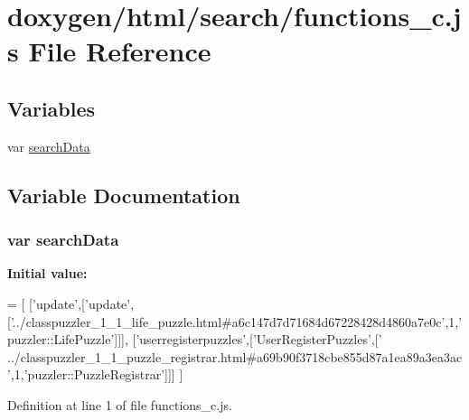 \hypertarget{a00095}{}\section{doxygen/html/search/functions\+\_\+c.js File Reference}
\label{a00095}
\subsection*{Variables}
\begin{DoxyCompactItemize}
\item 
var \hyperlink{a00095_ad01a7523f103d6242ef9b0451861231e}{search\+Data}
\end{DoxyCompactItemize}


\subsection{Variable Documentation}
\hypertarget{a00095_ad01a7523f103d6242ef9b0451861231e}{}
\subsubsection[{search\+Data}]{\setlength{\rightskip}{0pt plus 5cm}var search\+Data}\label{a00095_ad01a7523f103d6242ef9b0451861231e}
{\bfseries Initial value\+:}
\begin{DoxyCode}
=
[
  [\textcolor{stringliteral}{'update'},[\textcolor{stringliteral}{'update'},[\textcolor{stringliteral}{'../classpuzzler\_1\_1\_life\_puzzle.html#a6c147d7d71684d67228428d4860a7e0c'},1,\textcolor{stringliteral}{'
      puzzler::LifePuzzle'}]]],
  [\textcolor{stringliteral}{'userregisterpuzzles'},[\textcolor{stringliteral}{'UserRegisterPuzzles'},[\textcolor{stringliteral}{'
      ../classpuzzler\_1\_1\_puzzle\_registrar.html#a69b90f3718cbe855d87a1ea89a3ea3ac'},1,\textcolor{stringliteral}{'puzzler::PuzzleRegistrar'}]]]
]
\end{DoxyCode}


Definition at line 1 of file functions\+\_\+c.\+js.

